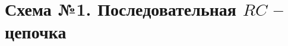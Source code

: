 



\def\labauthors{Понур К.А., Сарафанов Ф.Г., Сидоров Д.А.}
\def\labgroup{420}
\def\labnumber{210}
\def\labtheme{Исследование линейных двухполюсников и четырёхполюсников}
\renewcommand{\vec}{\mathbf}
\renewcommand{\Re}{\operatorname{Re}}
\renewcommand{\Im}{\operatorname{Im}}



\tableofcontents
\newpage
\section{Схема №1. Последовательная $RC$ -- цепочка}
\begin{center}
	
\end{center}

